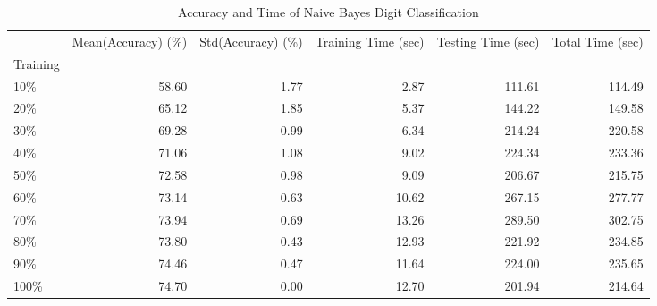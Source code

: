 \documentclass[10pt,parskip=half,
toc=sectionentrywithdots,
bibliography=totocnumbered,
captions=tableheading,numbers=noendperiod]{scrartcl}
\begin{document}
\begin{table}[H]
\caption{Accuracy and Time of Naive Bayes Digit Classification}\label{tbl:tlabel}
\centering
\begin{adjustbox}{max width=\textwidth}
\begin{tabular}{lrrrrr}
\toprule
{} &  Mean(Accuracy) (\%) &  Std(Accuracy) (\%) &  Training Time (sec) &  Testing Time (sec) &  Total Time (sec) \\
Training &                     &                    &                      &                     &                   \\
\midrule
10\%      &               58.60 &               1.77 &                 2.87 &              111.61 &            114.49 \\
20\%      &               65.12 &               1.85 &                 5.37 &              144.22 &            149.58 \\
30\%      &               69.28 &               0.99 &                 6.34 &              214.24 &            220.58 \\
40\%      &               71.06 &               1.08 &                 9.02 &              224.34 &            233.36 \\
50\%      &               72.58 &               0.98 &                 9.09 &              206.67 &            215.75 \\
60\%      &               73.14 &               0.63 &                10.62 &              267.15 &            277.77 \\
70\%      &               73.94 &               0.69 &                13.26 &              289.50 &            302.75 \\
80\%      &               73.80 &               0.43 &                12.93 &              221.92 &            234.85 \\
90\%      &               74.46 &               0.47 &                11.64 &              224.00 &            235.65 \\
100\%     &               74.70 &               0.00 &                12.70 &              201.94 &            214.64 \\
\bottomrule
\end{tabular}

\end{adjustbox}
\end{table}

\begin{figure}[H]\begin{center}\end{center}\label{fig:flabel}\end{figure}
\end{document}
